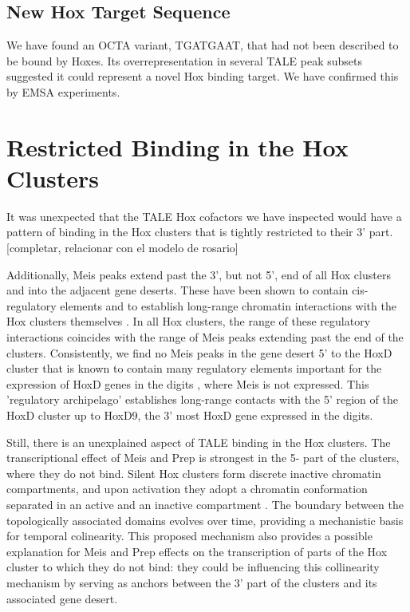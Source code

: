 \subsection{New Hox Target Sequence}

We have found an \ac{OCTA} variant, TGATGAAT, that had not been described to be bound by Hoxes. Its overrepresentation in several \ac{TALE} peak subsets suggested it could represent a novel Hox binding target. We have confirmed this by \ac{EMSA} experiments. 

\section{Restricted Binding in the Hox Clusters}

It was unexpected that the \ac{TALE} Hox cofactors we have inspected would have a pattern of binding in the Hox clusters that is tightly restricted to their 3' part. [completar, relacionar con el modelo de rosario]

Additionally, Meis peaks extend past the 3', but not 5', end of all Hox clusters and into the adjacent gene deserts. These have been shown to contain cis-regulatory elements and to establish long-range chromatin interactions with the Hox clusters themselves \parencite{Noordermeer2011, Andrey2013}. In all Hox clusters, the range of these regulatory interactions coincides with the range of Meis peaks extending past the end of the clusters. Consistently, we find no Meis peaks in the gene desert 5' to the HoxD cluster that is known to contain many regulatory elements important for the expression of HoxD genes in the digits \parencite{Montavon2011}, where Meis is not expressed. This 'regulatory archipelago' establishes long-range contacts with the 5' region of the HoxD cluster up to HoxD9, the 3' most HoxD gene expressed in the digits. 

Still, there is an unexplained aspect of \ac{TALE} binding in the Hox clusters. The transcriptional effect of Meis and Prep is strongest in the 5- part of the clusters, where they do not bind. Silent Hox clusters form discrete inactive chromatin compartments, and upon activation they adopt a chromatin conformation separated in an active and an inactive compartment \parencite{Noordermeer2011}. The boundary between the topologically associated domains evolves over time, providing a mechanistic basis for temporal colinearity. This proposed mechanism also provides a possible explanation for Meis and Prep effects on the transcription of parts of the Hox cluster to which they do not bind: they could be influencing this collinearity mechanism by serving as anchors between the 3' part of the clusters and its associated gene desert. 

